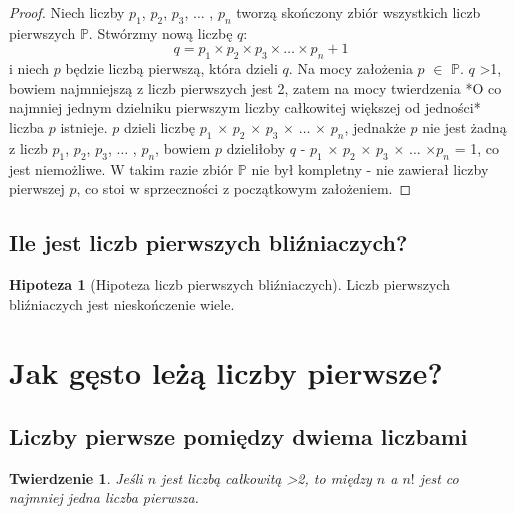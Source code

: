 \documentclass[10pt,onecolumn]{article}
\newtheorem{theorem}{Twierdzenie}
\theoremstyle{definition}
\theoremstyle{hypothesis}
\newtheorem{hypothesis}{Hipoteza}
\theoremstyle{capability}
\begin{document}
\begin{proof}
Niech liczby $p_1$, $p_2$, $p_3$, $\ldots$ , $p_n$ tworzą skończony zbiór wszystkich liczb pierwszych $\mathbb{P}$. Stwórzmy nową liczbę $q$: $$ q = p_1 \times p_2 \times p_3 \times \ldots \times p_n + 1$$ i niech $p$ będzie liczbą pierwszą, która dzieli $q$. Na mocy założenia $p$ $\in$ $\mathbb{P}$.
$q$ \textgreater 1, bowiem najmniejszą z liczb pierwszych jest 2, zatem na mocy twierdzenia *O co najmniej jednym dzielniku pierwszym liczby całkowitej większej od jedności* liczba $p$ istnieje. $p$ dzieli liczbę $p_1$ $\times$ $p_2$ $\times$ $p_3$ $\times$ $\ldots$ $\times$ $p_n$, jednakże $p$ nie jest żadną z liczb  $p_1$, $p_2$, $p_3$, $\ldots$ , $p_n$, bowiem $p$ dzieliłoby $q$ - $p_1$ $\times$ $p_2$ $\times$ $p_3$ $\times$ $\ldots$ $\times p_n$ = 1, co jest niemożliwe. W takim razie zbiór $\mathbb{P}$ nie był kompletny - nie zawierał liczby pierwszej $p$, co stoi w sprzeczności z początkowym założeniem.
\end{proof}

\subsection{Ile jest liczb pierwszych bliźniaczych?}

\begin{hypothesis}[Hipoteza liczb pierwszych bliźniaczych]
Liczb pierwszych bliźniaczych jest nieskończenie wiele.
\label{Twin_primes_hyp}
\end{hypothesis}

\newpage


\section{Jak gęsto leżą liczby pierwsze?}

\subsection{Liczby pierwsze pomiędzy dwiema liczbami}

\begin{theorem}
Jeśli $n$ jest liczbą całkowitą \textgreater 2, to między $n$ a $n!$ jest co najmniej jedna liczba pierwsza.
\end{theorem}
\end{document}
